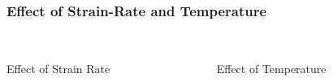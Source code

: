 \documentclass{beamer}
\begin{document}
    \begin{frame}
      \frametitle{Effect of Strain-Rate and Temperature}
      \begin{columns}[c]
        \begin{column}{5cm}
          \centering
           \\
          {\scriptsize Effect of Strain Rate}
        \end{column}
        \begin{column}{5cm}
          \centering
           \\
          {\scriptsize Effect of Temperature}
        \end{column}
      \end{columns}
    \end{frame}
\end{document}

